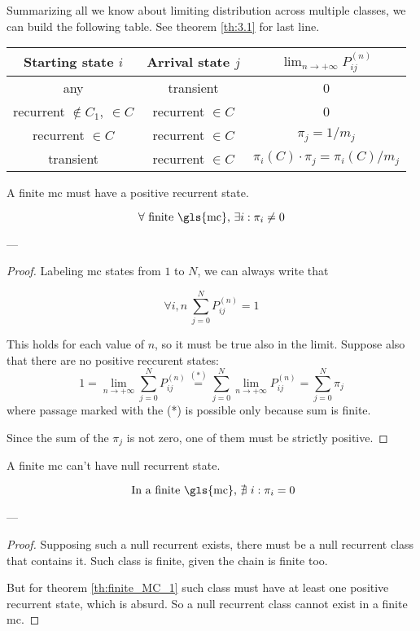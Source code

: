 	Summarizing all we know about limiting distribution across multiple classes, we can build the following table.
	See theorem \ref{th:3.1} for last line.
	\begin{center}\begin{tabular}{c|c|c}
		Starting state $i$ & Arrival state $j$ & $\lim_{n \to +\infty} P_{ij}^{(n)}$ \\ \hline
		any & transient & 0 \\
		recurrent $\notin C_1 ,\: \in C$ & recurrent $\in C$ & 0 \\
		recurrent $\in C$ & recurrent $\in C$ & $\pi_j = 1 / m_j$ \\
		transient & recurrent $\in C$ & $\pi_i(C)\cdot\pi_j = \pi_i(C) / m_j$ \\
	\end{tabular}\end{center}

	\begin{theorem} \label{th:finite_MC_1}
		A finite \gls{mc} must have a positive recurrent state.

		$$ \forall \text{ finite \gls{mc}, } \exists i: \pi_i \neq 0 $$
	\end{theorem}
	---
	\begin{proof}
		Labeling \gls{mc} states from $1$ to $N$, we can always write that

		$$ \forall i, n ~ \sum_{j=0}^N P_{ij}^{(n)} = 1$$

		This holds for each value of $n$, so it must be true also in the limit.
		Suppose also that there are no positive reccurent states:
		$$ 1 = \lim_{n \to +\infty} \sum_{j=0}^N P_{ij}^{(n)} \stackrel{(*)}{=} \sum_{j=0}^N \lim_{n \to +\infty} P_{ij}^{(n)}
		= \sum_{j=0}^N \pi_j $$
		where passage marked with the (*) is possible only because sum is finite.

		Since the sum of the $\pi_j$ is not zero, one of them must be strictly positive.
	\end{proof}

	\begin{theorem}
		A finite \gls{mc} can't have null recurrent state.

		$$ \text{ In a finite \gls{mc}, } \nexists~ i: \pi_i = 0 $$
	\end{theorem}
	---
	\begin{proof}
		Supposing such a null recurrent exists, there must be a null recurrent class that contains it.
		Such class is finite, given the chain is finite too.

		But for theorem \ref{th:finite_MC_1} such class must have at least one positive recurrent state, which is absurd.
		So a null recurrent class cannot exist in a finite \gls{mc}.
	\end{proof}

